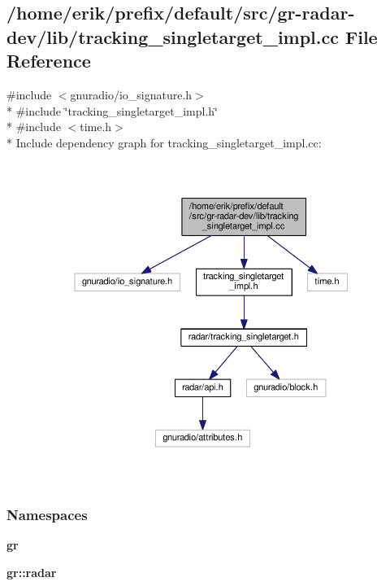 \subsection{/home/erik/prefix/default/src/gr-\/radar-\/dev/lib/tracking\+\_\+singletarget\+\_\+impl.cc File Reference}
\label{tracking__singletarget__impl_8cc}
{\ttfamily \#include $<$gnuradio/io\+\_\+signature.\+h$>$}\\*
{\ttfamily \#include \char`\"{}tracking\+\_\+singletarget\+\_\+impl.\+h\char`\"{}}\\*
{\ttfamily \#include $<$time.\+h$>$}\\*
Include dependency graph for tracking\+\_\+singletarget\+\_\+impl.\+cc\+:
\nopagebreak
\begin{figure}[H]
\begin{center}
\leavevmode
\includegraphics[width=350pt]{d7/d87/tracking__singletarget__impl_8cc__incl}
\end{center}
\end{figure}
\subsubsection*{Namespaces}
\begin{DoxyCompactItemize}
\item 
 {\bf gr}
\item 
 {\bf gr\+::radar}
\end{DoxyCompactItemize}
